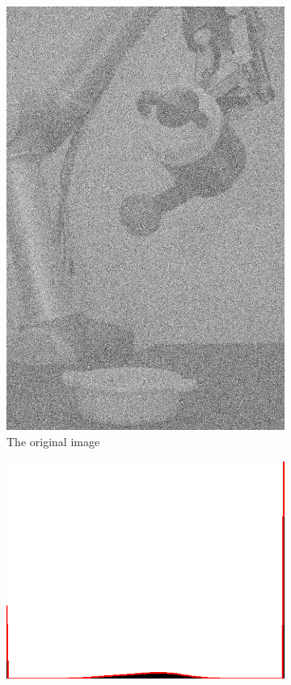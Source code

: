 \begin{figure}[H]
    
      \begin{subfigure}[b]{0.16\textwidth}
        \includegraphics[width=\textwidth]{img2/src.png}
        \caption{The original image}
        \label{fig:img2_src}
    \end{subfigure}
    \begin{subfigure}[b]{0.16\textwidth}
        \includegraphics[width=\textwidth]{img2/hist.png}

\end{subfigure}
\end{figure}
